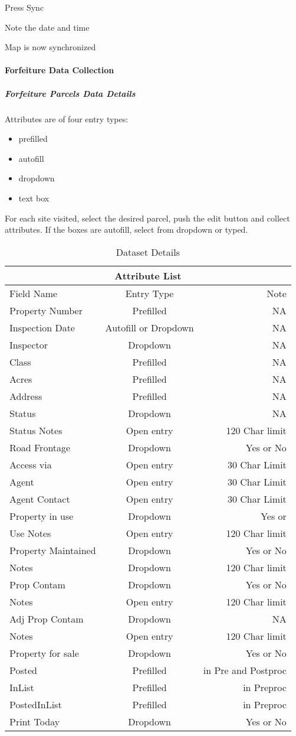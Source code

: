 \documentclass[class=article , crop=false, titlepage, twoside, multi={itemize, figure, verbatim}, float=false]{standalone}
\begin{document}
\noindent Press Sync
\vspace{1.5in}

Note the date and time
\vspace{1.5in}

Map is now synchronized
\clearpage
\paragraph{Forfeiture Data Collection}
\subparagraph{Forfeiture Parcels Data Details}
Attributes are of four entry types:\begin{itemize}
\item prefilled
\item autofill
\item dropdown
\item text box \end{itemize}
For each site visited, select the desired parcel, push the edit button and collect attributes.  If the boxes are autofill, select from dropdown or typed.\bigskip 
\begin{table}
\centering
\begin{tabular}{|l|c|r|}
\hline
\multicolumn{3}{|c|}{Attribute List} \\
\hline
Field Name&Entry Type&Note\\ \hline
Property Number&Prefilled&NA\\
Inspection Date&{\scriptsize Autofill or Dropdown}&NA\\
Inspector&Dropdown&NA\\
Class&Prefilled&NA\\
Acres&Prefilled&NA\\
Address&Prefilled&NA\\
Status&Dropdown&NA\\
Status Notes&Open entry&120 Char limit\\
Road Frontage&Dropdown&Yes or No\\
Access via&Open entry&30 Char Limit\\
Agent&Open entry&30 Char Limit\\
Agent Contact&Open entry&30 Char Limit\\
Property in use&Dropdown&Yes or\\
Use Notes&Open entry&120 Char limit\\
Property Maintained&Dropdown&Yes or No\\
Notes&Dropdown&120 Char limit\\
Prop Contam&Dropdown&Yes or No\\
Notes&Open entry&120 Char limit\\
Adj Prop Contam&Dropdown&NA\\
Notes&Open entry&120 Char limit\\
Property for sale&Dropdown&Yes or No\\
Posted&Prefilled&in Pre and Postproc\\
InList&Prefilled&in Preproc\\
PostedInList&Prefilled&in Preproc\\
Print Today&Dropdown&Yes or No\\ \hline
\end{tabular}
\caption{Dataset Details}
\end{table}
\end{document}
